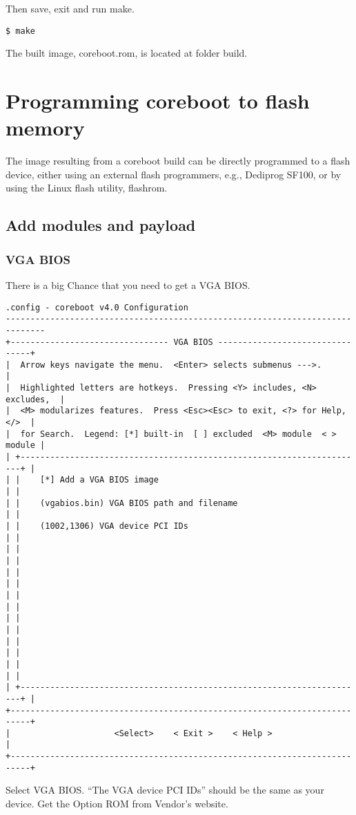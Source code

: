 \documentclass[titlepage,12pt]{article}
\begin{document}
Then save, exit and run make.

{ \small
\begin{verbatim}
$ make
\end{verbatim}
}
The built image, coreboot.rom, is located at folder build.

\section{Programming coreboot to flash memory}
The image resulting from a coreboot build can be directly programmed to
a flash device, either using an external flash programmers, e.g., Dediprog SF100, or by using the
Linux flash utility, flashrom.


\subsection{Add modules and payload}

\subsubsection{VGA BIOS}
There is a big Chance that you need to get a VGA BIOS.
{ \small
\begin{verbatim}
.config - coreboot v4.0 Configuration
------------------------------------------------------------------------------
+-------------------------------- VGA BIOS --------------------------------+
|  Arrow keys navigate the menu.  <Enter> selects submenus --->.           |
|  Highlighted letters are hotkeys.  Pressing <Y> includes, <N> excludes,  |
|  <M> modularizes features.  Press <Esc><Esc> to exit, <?> for Help, </>  |
|  for Search.  Legend: [*] built-in  [ ] excluded  <M> module  < > module |
| +----------------------------------------------------------------------+ |
| |    [*] Add a VGA BIOS image                                          | |
| |    (vgabios.bin) VGA BIOS path and filename                          | |
| |    (1002,1306) VGA device PCI IDs                                    | |
| |                                                                      | |
| |                                                                      | |
| |                                                                      | |
| |                                                                      | |
| |                                                                      | |
| |                                                                      | |
| +----------------------------------------------------------------------+ |
+--------------------------------------------------------------------------+
|                     <Select>    < Exit >    < Help >                     |
+--------------------------------------------------------------------------+
\end{verbatim}
}
Select VGA BIOS. ``The VGA device PCI IDs'' should be the same as your device. Get the
Option ROM from Vendor's website.
\end{document}
